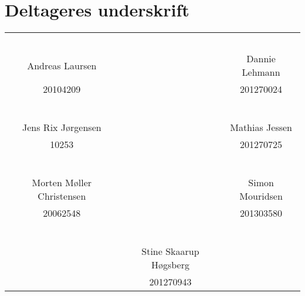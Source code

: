 \chapter*{Deltageres underskrift}

\phantom{Luft}

\phantom{Luft}

\begin{table}[H]
	\centering
		\begin{tabular}{c c c}
		&&\\
		&&\\
		&&\\
		&&\\
			\underline{\phantom{mmmmmmmmmmmmmm}} && \underline{\phantom{mmmmmmmmmmmmmm}} \\
			Andreas Laursen && Dannie Lehmann\\
			20104209 && 201270024\\
			&&\\
			&&\\
			&&\\
			&&\\
			&&\\
			\underline{\phantom{mmmmmmmmmmmmmm}} && \underline{\phantom{mmmmmmmmmmmmmm}} \\
			Jens Rix Jørgensen && Mathias Jessen\\
			10253 && 201270725\\
			&&\\
			&&\\
			&&\\
			&&\\
			&&\\
			\underline{\phantom{mmmmmmmmmmmmmm}} && \underline{\phantom{mmmmmmmmmmmmmm}} \\
			Morten Møller Christensen && Simon Mouridsen\\
			20062548 && 201303580\\
			&&\\
			&&\\
			&&\\
			&&\\
			&&\\
		 							& \underline{\phantom{mmmmmmmmmmmmmm}} 	&			\\														
									& Stine Skaarup Høgsberg\\
									& 201270943								
		\end{tabular}
\end{table}
